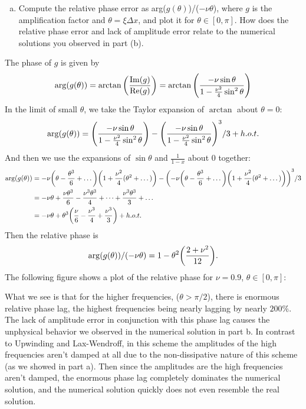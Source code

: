 \documentclass[12pt]{article}
\begin{document}
\begin{enumerate}[(a)]
\begin{figure}[H]
\end{figure} 
\newpage
\item Compute the relative phase error as arg($g(\theta)$)/($-\nu\theta$), where $g$ is the amplification factor and $\theta = \xi\Delta x$, and plot it for $\theta\in[0,\pi]$.  How does the relative phase error and lack of amplitude error relate to the numerical solutions you observed in part (b).
\end{enumerate}

The phase of $g$ is given by
$$\arg(g(\theta)) = \arctan\qty(\dfrac{\Im(g)}{\Re(g)})= \arctan\qty(\dfrac{-\nu\sin\theta}{1-\frac{\nu^2}{4}\sin^2\theta}) $$
In the limit of small $\theta$, we take the Taylor expansion of $\arctan$ about $\theta=0$:
$$\arg(g(\theta)) = \qty(\dfrac{-\nu\sin\theta}{1-\frac{\nu^2}{4}\sin^2\theta}) - \qty(\dfrac{-\nu\sin\theta}{1-\frac{\nu^2}{4}\sin^2\theta})^3/3 + h.o.t.$$
And then we use the expansions of $\sin\theta$ and $\frac{1}{1-x}$ about 0 together:
\begin{align*}
\arg(g(\theta)) &= -\nu\qty(\theta-\frac{\theta^3}{6}+\dots)\qty(1+\frac{\nu^2}{4}(\theta^2 + \dots)) - \qty(-\nu\qty(\theta-\frac{\theta^3}{6}+\dots)\qty(1+\frac{\nu^2}{4}(\theta^2 + \dots)))^3/3 \\
&= -\nu \theta + \frac{\nu\theta^3}{6} - \frac{\nu^3\theta^3}{4} + \dots + \dfrac{\nu^3\theta^3}{3} + \dots \\
&= -\nu \theta + \theta^3\qty(\frac{\nu}{6} - \frac{\nu^3}{4}+\dfrac{\nu^3}{3}) + h.o.t.
\end{align*}
Then the relative phase is 
$$\arg(g(\theta))/(-\nu\theta) = 1 - \theta^2\qty(\dfrac{2+\nu^2}{12}).$$
The following figure shows a plot of the relative phase for $\nu=0.9$, $\theta \in [0,\pi]$:
\begin{figure}[H]
\centering{}\end{figure}
What we see is that for the higher frequencies, ($\theta >\pi/2$), there is enormous relative phase lag, the highest frequencies being nearly lagging by nearly $200\%$.  The lack of amplitude error in conjunction with this phase lag causes the unphysical behavior we observed in the numerical solution in part b.  In contrast to Upwinding and Lax-Wendroff, in this scheme the amplitudes of the high frequencies aren't damped at all due to the non-dissipative nature of this scheme (as we showed in part a).  Then since the amplitudes are the high frequencies aren't damped, the enormous phase lag completely dominates the numerical solution, and the numerical solution quickly does not even resemble the real solution.\\
\end{document}
